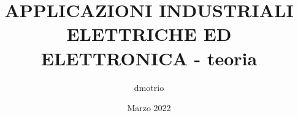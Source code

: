 \documentclass{article}
\begin{document}
    \author{dmotrio}
    \title{APPLICAZIONI INDUSTRIALI ELETTRICHE ED ELETTRONICA - teoria}
    \date{Marzo 2022}

    \maketitle
    \tableofcontents

    \listoffigures
    \listoftables

    
\end{document}
